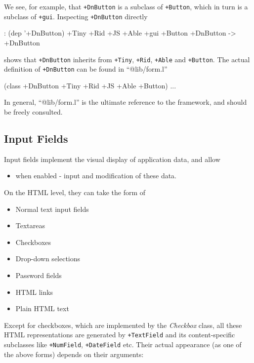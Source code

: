 We see, for example, that \texttt{+DnButton} is a subclass of \texttt{+Button}, which
in turn is a subclass of \texttt{+gui}. Inspecting \texttt{+DnButton} directly


\begin{wideverbatim}
: (dep '+DnButton)
   +Tiny
   +Rid
   +JS
   +Able
      +gui
   +Button
+DnButton
-> +DnButton
\end{wideverbatim}

shows that \texttt{+DnButton} inherits from \texttt{+Tiny}, \texttt{+Rid}, \texttt{+Able} and
\texttt{+Button}. The actual definition of \texttt{+DnButton} can be found in
``@lib/form.l''


\begin{wideverbatim}
(class +DnButton +Tiny +Rid +JS +Able +Button)
...
\end{wideverbatim}

In general, ``@lib/form.l'' is the ultimate reference to the framework,
and should be freely consulted.

 
\subsection{Input Fields}
\label{sec:appl-devel-input-fields}


Input fields implement the visual display of application data, and allow
\begin{itemize}
\item when enabled - input and modification of these data.
\end{itemize}

On the HTML level, they can take the form of

\begin{itemize}
\item Normal text input fields
\item Textareas
\item Checkboxes
\item Drop-down selections
\item Password fields
\item HTML links
\item Plain HTML text
\end{itemize}

Except for checkboxes, which are implemented by the
\emph{Checkbox} class, all these HTML representations are
generated by \texttt{+TextField} and its content-specific subclasses like
\texttt{+NumField}, \texttt{+DateField} etc. Their actual appearance (as one of the
above forms) depends on their arguments:

